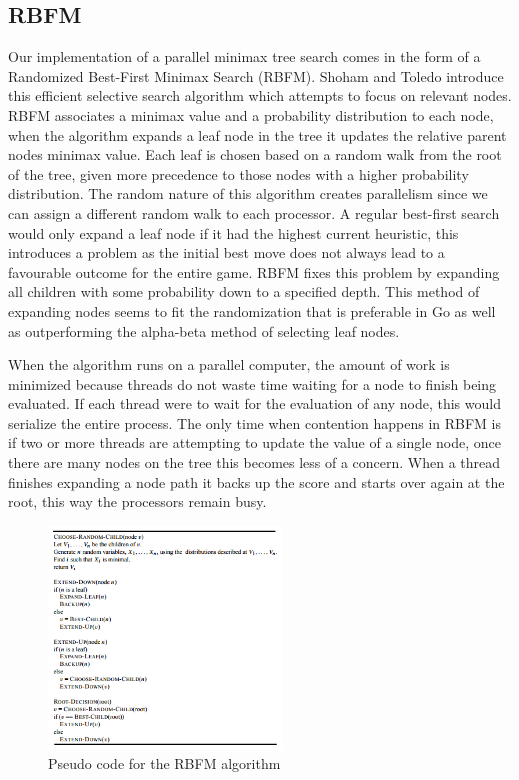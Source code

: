 \documentclass[conference]{IEEEtran}
\begin{document}
\subsection{RBFM}
Our implementation of a parallel minimax tree search comes in the form of a Randomized Best-First Minimax Search (RBFM). Shoham and Toledo introduce this efficient selective search algorithm which attempts to focus on relevant nodes. RBFM associates a minimax value and a probability distribution to each node, when the algorithm expands a leaf node in the tree it updates the relative parent nodes minimax value. Each leaf is chosen based on a random walk from the root of the tree, given more precedence to those nodes with a higher probability distribution. The random nature of this algorithm creates parallelism since we can assign a different random walk to each processor. A regular best-first search would only expand a leaf node if it had the highest current heuristic, this introduces a problem as the initial best move does not always lead to a favourable outcome for the entire game. RBFM fixes this problem by expanding all children with some probability down to a specified depth.  This method of expanding nodes seems to fit the randomization that is preferable in Go as well as outperforming the alpha-beta method of selecting leaf nodes.\par
When the algorithm runs on a parallel computer, the amount of work is minimized because threads do not waste time waiting for a node to finish being evaluated. If each thread were to wait for the evaluation of any node, this would serialize the entire process. The only time when contention happens in RBFM is if two or more threads are attempting to update the value of a single node, once there are many nodes on the tree this becomes less of a concern. When a thread finishes expanding a node path it backs up the score and starts over again at the root, this way the processors remain busy.

\begin{figure}[h]
\includegraphics[width=235px]{RBFM}
\caption{Pseudo code for the RBFM algorithm}
\centering
\end{figure}
\end{document}
